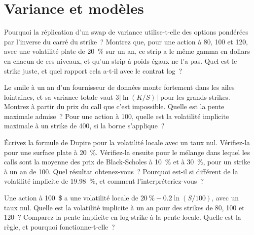 \section{Variance et modèles}

\begin{question}\label{iq:iv2:vol-surface-and-vol-trading:26}
Pourquoi la réplication d'un swap de variance utilise-t-elle des options pondérées par l'inverse du carré du strike~? Montrez que, pour une action à 80, 100 et 120, avec une volatilité plate de 20~\% sur un an, ce strip a le même gamma en dollars en chacun de ces niveaux, et qu'un strip à poids égaux ne l'a pas. Quel est le strike juste, et quel rapport cela a-t-il avec le contrat log~?
\end{question}

\begin{question}\label{iq:iv2:vol-surface-and-vol-trading:27}
Le smile à un an d'un fournisseur de données monte fortement dans les ailes lointaines, et sa variance totale vaut $3|\ln(K/S)|$ pour les grands strikes. Montrez à partir du prix du call que c'est impossible. Quelle est la pente maximale admise~? Pour une action à 100, quelle est la volatilité implicite maximale à un strike de 400, si la borne s'applique~?
\end{question}

\begin{question}\label{iq:iv2:vol-surface-and-vol-trading:28}
Écrivez la formule de Dupire pour la volatilité locale avec un taux nul. Vérifiez-la pour une surface plate à 20~\%. Vérifiez-la ensuite pour le mélange dans lequel les calls sont la moyenne des prix de Black-Scholes à 10~\% et à 30~\%, pour un strike à un an de 100. Quel résultat obtenez-vous~? Pourquoi est-il si différent de la volatilité implicite de 19.98~\%, et comment l'interpréteriez-vous~?
\end{question}

\begin{question}\label{iq:iv2:vol-surface-and-vol-trading:29}
Une action à 100~\$ a une volatilité locale de $20~\% - 0.2\ln(S/100)$, avec un taux nul. Quelle est la volatilité implicite à un an pour des strikes de 80, 100 et 120~? Comparez la pente implicite en log-strike à la pente locale. Quelle est la règle, et pourquoi fonctionne-t-elle~?
\end{question}

